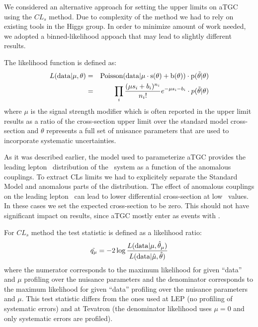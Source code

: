 We considered an alternative approach for setting the upper limits on
aTGC using the $CL_{s}$ method. Due to complexity of the method we had
to rely on existing tools in the Higgs group. In order to minimize
amount of work needed, we adopted a binned-likelihood appoach that may
lead to slightly different results.

The likelihood function is defined as:
\begin{eqnarray}
  L(\rm{data}|\mu,\theta)&=&\rm{Poisson}(\rm{data}|\mu\cdot s(\theta)+b(\theta))\cdot p(\tilde{\theta}|\theta) \nonumber\\
 &=&\prod_i\frac{(\mu s_i+b_i)^{n_i}}{n_i!}e^{-\mu s_i-b_i}\cdot p(\tilde{\theta}|\theta)
\label{eq:likelihood}
\end{eqnarray}
where $\mu$ is the signal strength modifier which is often reported in
the upper limit results as a ratio of the cross-section upper limit
over the standard model cross-section and $\theta$ represents a full
set of nuisance parameters that are used to incorporate systematic
uncertainties. 

As it was described earlier, the model used to parameterize aTGC
provides the leading lepton \pt\ distribution of the \ww\ system as a
function of the anomalous couplings. To extract CLs limits we had to
explicitely separate the Standard Model and anomalous parts of the
distribution. The effect of anomalous couplings on the leading
lepton \pt\ can lead to lower differential cross-section at low \pt\
values. In these cases we set the expected cross-section to be
zero. This should not have significant impact on results, since aTGC
mostly enter as events with \pt{}.

For $CL_{s}$ method the test statistic is defined as a likelihood
ratio:
\begin{equation}
\tilde{q_\mu}=-2\log\frac{L(\rm{data}|\mu,\hat\theta_\mu)}{L(\rm{data}|\hat\mu,\hat\theta)}
\end{equation}
where the numerator corresponds to the maximum likelihood for given
``data'' and $\mu$ profiling over the nuisance parameters and the
denominator corresponds to the maximum likelihood for given ``data''
profiling over the nuisance parameters and $\mu$. This test statistic
differs from the ones used at LEP (no profiling of systematic errors)
and at Tevatron (the denominator likelihood uses $\mu=0$ and only
systematic errors are profiled).

